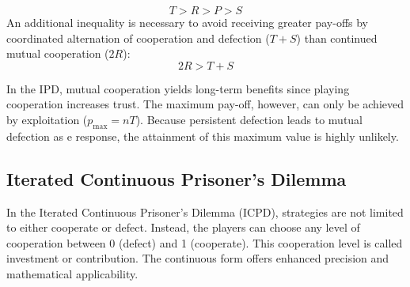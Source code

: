 \documentclass[11pt]{article}
\begin{document}
\begin{equation}
T > R > P > S
\end{equation}
An additional inequality is necessary to avoid receiving greater pay-offs by coordinated alternation of cooperation and defection ($T + S$) than continued mutual cooperation ($2 R$):
\begin{equation}\label{eq:AvGrPa}
2R > T + S
\end{equation}

In the IPD, mutual cooperation yields long-term benefits since playing cooperation increases trust.
The maximum pay-off, however, can only be achieved by exploitation ($p_{\mathrm{max}} = n T$).
Because persistent defection leads to mutual defection as e response, the attainment of this maximum value is highly unlikely.

%
\subsection{Iterated Continuous Prisoner's Dilemma}

In the Iterated Continuous Prisoner's Dilemma (ICPD), strategies are not limited to either cooperate or defect.
Instead, the players can choose any level of cooperation between 0 (defect) and 1 (cooperate).
This cooperation level is called investment or contribution.
The continuous form offers enhanced precision and mathematical applicability.
%
\end{document}
